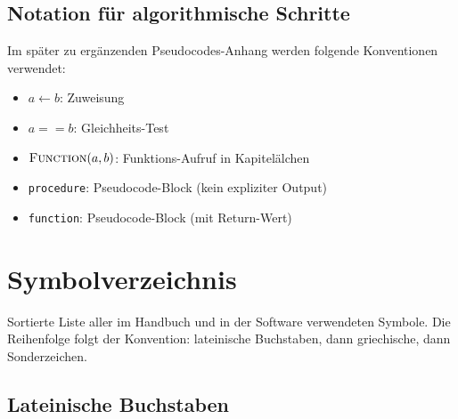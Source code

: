 \documentclass[11pt,a4paper,twoside]{article}
\theoremstyle{remark}
\begin{document}
\subsection{Notation f\"ur algorithmische Schritte}

Im sp\"ater zu erg\"anzenden Pseudocodes-Anhang werden folgende Konventionen
verwendet:

\begin{itemize}\setlength{\itemsep}{2pt}
  \item $a \gets b$: Zuweisung
  \item $a == b$: Gleichheits-Test
  \item $\textsc{Function}(a, b)$: Funktions-Aufruf in Kapitel\"alchen
  \item \texttt{procedure}: Pseudocode-Block (kein expliziter Output)
  \item \texttt{function}: Pseudocode-Block (mit Return-Wert)
\end{itemize}

\section{Symbolverzeichnis}
\label{app:symbols}

Sortierte Liste aller im Handbuch und in der Software verwendeten
Symbole. Die Reihenfolge folgt der Konvention: lateinische
Buchstaben, dann griechische, dann Sonderzeichen.

\subsection{Lateinische Buchstaben}
\end{document}
